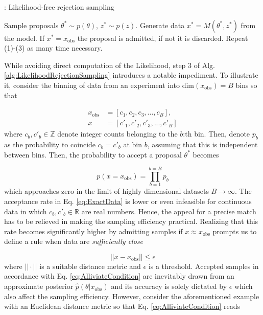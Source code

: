 \documentclass[%
 reprint,
 amsmath,amssymb,
 aps,
]{revtex4-2}
\begin{document}
\begin{algorithm}[H]
\caption{: Likelihood-free rejection sampling} \label{alg:LikelihoodRejectionSampling}
\begin{algorithmic}[1]
\State Sample proposals $\theta^* \sim p(\theta)$, $z^* \sim p(z)$.
\State Generate data $x^* = M(\theta^*, z^*)$ from the model.
\State If $x^* = x_{\text{obs}}$ the proposal is admitted, if not it is discarded.
\State Repeat (1)-(3) as many time necessary.
\end{algorithmic}
\end{algorithm}
While avoiding direct computation of the Likelihood, step $3$ of Alg. \ref{alg:LikelihoodRejectionSampling} introduces a notable impediment.
To illustrate it, consider the binning of data from an experiment into $\text{dim}(x_{\text{obs}})=B$ bins so that 

\begin{align}
    x_{\text{obs}} &= \left[c_1, c_2, c_3, ..., c_{B}\right], \label{eq:DobsEx} \\
    x &= \left[c'_1, c'_2, c'_3, ..., c'_{B}\right] \label{eq:DsimEx}
\end{align}
where $c_b, c'_b \in \mathbb{Z}$ denote integer counts belonging to the $b$:th bin. Then, denote $p_b$ as the probability to coincide $c_b = c'_b$ at bin $b$, assuming that this is independent between bins. Then, the probability to accept a proposal $\theta^*$ becomes

\begin{equation} \label{eq:ExactData}
    p(x = x_{\text{obs}}) = \prod_{b=1}^{b=B} p_b
\end{equation}
which approaches zero in the limit of highly dimensional datasets $B \to \infty$. The acceptance rate in Eq. \eqref{eq:ExactData} is lower or even infeasible for continuous data in which $c_b, c'_b \in \mathbb{R}$ are real numbers. Hence, the appeal for a precise match has to be relieved in making the sampling efficiency practical. Realizing that this rate becomes significantly higher by admitting samples if $x \approx x_{\text{obs}}$ prompts us to define a rule when data are \textit{sufficiently close}

\begin{equation} \label{eq:AlliviateCondition}
    ||x - x_{\text{obs}}|| \leq \epsilon 
\end{equation}
where $||\cdot||$ is a suitable distance metric and $\epsilon$ is a threshold. Accepted samples in accordance with Eq. \eqref{eq:AlliviateCondition} are inevitably drawn from an approximate posterior $\hat{p}(\theta|x_{\text{obs}})$ and its accuracy is solely dictated by $\epsilon$ which also affect the sampling efficiency. However, consider the aforementioned example with an Euclidean distance metric so that Eq. \eqref{eq:AlliviateCondition} reads
\end{document}
